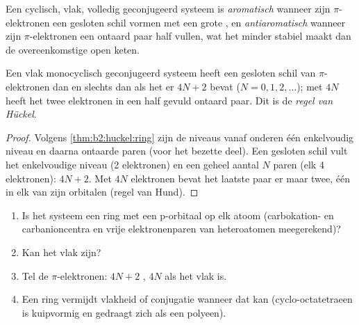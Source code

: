 \begin{definition}[Aromaticiteit]\label{def:b2:huckel:aromatic}
Een cyclisch, vlak, volledig geconjugeerd systeem is \emph{aromatisch} wanneer
zijn $\pi$-elektronen een gesloten schil vormen met een grote , en
\emph{antiaromatisch} wanneer zijn $\pi$-elektronen een ontaard paar half vullen,
wat het minder stabiel maakt dan de overeenkomstige open keten.
\end{definition}

\begin{theorem}\label{thm:b2:huckel:huckel-rule}
Een vlak monocyclisch geconjugeerd systeem heeft een gesloten schil van $\pi$-elektronen dan en slechts dan
als het er $4N + 2$ bevat ($N = 0, 1, 2, \dots$); met $4N$ heeft het twee elektronen in een
half gevuld ontaard paar. Dit is de \emph{regel van Hückel}.
\end{theorem}

\begin{proof}
Volgens \cref{thm:b2:huckel:ring} zijn de niveaus vanaf onderen één enkelvoudig niveau en
daarna ontaarde paren (voor het bezette deel). Een gesloten schil vult het enkelvoudige
niveau (2 elektronen) en een geheel aantal $N$ paren (elk 4 elektronen): $4N + 2$. Met
$4N$ elektronen bevat het laatste paar er maar twee, één in elk van zijn orbitalen (regel van
Hund).
\end{proof}

\begin{method}\label{met:b2:huckel:aromaticity}
\begin{enumerate}
  \item Is het systeem een ring met een p-orbitaal op elk atoom (carbokation- en
        carbanioncentra en vrije elektronenparen van heteroatomen meegerekend)?
  \item Kan het vlak zijn?
  \item Tel de $\pi$-elektronen: $4N + 2$ , $4N$  als het vlak is.
  \item Een  ring vermijdt vlakheid of conjugatie wanneer dat kan
        (cyclo-octatetraeen is kuipvormig en gedraagt zich als een polyeen).
\end{enumerate}
\end{method}

